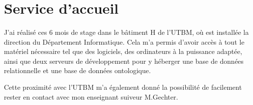 \section{Service d'accueil}
\paragraph{} \hspace{10mm}
J'ai réalisé ces 6 mois de stage dans le bâtiment H de l'UTBM, où est installée la direction du Département Informatique. Cela m'a permis d'avoir accès à tout le matériel nécessaire tel que des logiciels, des ordinateurs à la puissance adaptée, ainsi que deux serveurs de développement pour y héberger une base de données relationnelle et une base de données ontologique.

Cette proximité avec l'UTBM m'a également donné la possibilité de facilement rester en contact avec mon enseignant suiveur M.Gechter.